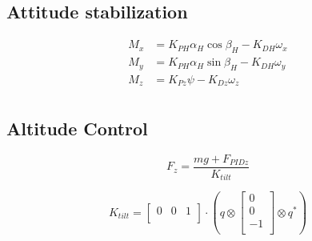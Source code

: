 \documentclass{article}
\numberwithin{equation}{section} %
\begin{document}
\subsection{Attitude stabilization}

\begin{align}
	M_x &= K_{PH} \alpha_H \cos \beta_H - K_{DH} \omega_x \\
	M_y &= K_{PH} \alpha_H \sin \beta_H - K_{DH} \omega_y \\
	M_z &= K_{Pz} \psi - K_{Dz} \omega_z \\
\end{align}

\subsection{Altitude Control}

\begin{equation}
	F_z = \frac{mg + F_{PIDz}} {K_{tilt}}
\end{equation}

\begin{equation}
	K_{tilt} = 
	\begin{bmatrix}
		0 & 0 & 1 \\	
	\end{bmatrix}
	\cdot
	\left(
		q \otimes
			\begin{bmatrix}
				0 \\
				0 \\
				-1 \\
			\end{bmatrix}
		\otimes q^*
	\right)
\end{equation}







\end{document}
